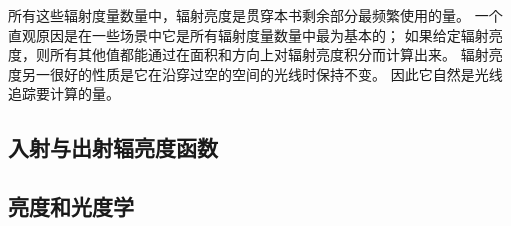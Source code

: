 所有这些辐射度量数量中，辐射亮度是贯穿本书剩余部分最频繁使用的量。
一个直观原因是在一些场景中它是所有辐射度量数量中最为基本的；
如果给定辐射亮度，则所有其他值都能通过在面积和方向上对辐射亮度积分而计算出来。
辐射亮度另一很好的性质是它在沿穿过空的空间的光线时保持不变。
因此它自然是光线追踪要计算的量。

\subsection{入射与出射辐亮度函数}\label{sub:入射与出射辐亮度函数}

\subsection{亮度和光度学}\label{sub:亮度和光度学}